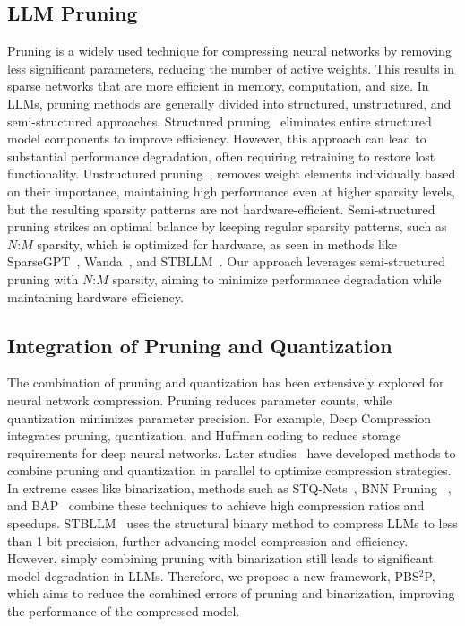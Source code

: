 \subsection{LLM Pruning} 
Pruning is a widely used technique for compressing neural networks by removing less significant parameters, reducing the number of active weights. This results in sparse networks that are more efficient in memory, computation, and size. In LLMs, pruning methods are generally divided into structured, unstructured, and semi-structured approaches. Structured pruning~\cite{ma2023llm,ashkboos2024slicegpt,xia2023sheared,an2024fluctuation} eliminates entire structured model components to improve efficiency. However, this approach can lead to substantial performance degradation, often requiring retraining to restore lost functionality. Unstructured pruning~\cite{dong2024pruner}, removes weight elements individually based on their importance, maintaining high performance even at higher sparsity levels, but the resulting sparsity patterns are not hardware-efficient. Semi-structured pruning strikes an optimal balance by keeping regular sparsity patterns, such as $N$:$M$ sparsity, which is optimized for hardware, as seen in methods like SparseGPT~\cite{frantar2023sparsegpt}, Wanda~\cite{sun2023simple}, and STBLLM~\cite{dong2024stbllm}. Our approach leverages semi-structured pruning with $N$:$M$ sparsity, aiming to minimize performance degradation while maintaining hardware efficiency.


\subsection{Integration of Pruning and Quantization}
The combination of pruning and quantization has been extensively explored for neural network compression. Pruning reduces parameter counts, while quantization minimizes parameter precision. For example, Deep Compression~\cite{han2015deep} integrates pruning, quantization, and Huffman coding to reduce storage requirements for deep neural networks. Later studies~\citep{tung2018clip, yang2020automatic, hu2021opq} have developed methods to combine pruning and quantization in parallel to optimize compression strategies. In extreme cases like binarization, methods such as STQ-Nets~\cite{munagala2020stq}, BNN Pruning ~\cite{li2020bnn}, and BAP~\cite{wang2021extremely} combine these techniques to achieve high compression ratios and speedups. STBLLM~\cite{dong2024stbllm} uses the structural binary method to compress LLMs to less than 1-bit precision, further advancing model compression and efficiency. However, simply combining pruning with binarization still leads to significant model degradation in LLMs. Therefore, we propose a new framework, PBS$^2$P, which aims to reduce the combined errors of pruning and binarization, improving the performance of the compressed model.
\vspace{-1mm}